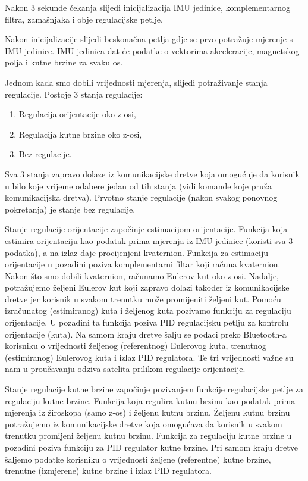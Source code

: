 \documentclass[times, utf8, diplomski, numeric]{templates/template}
\begin{document}
{{{{                Nakon 3 sekunde čekanja slijedi inicijalizacija IMU jedinice, komplementarnog filtra, zamašnjaka i obje regulacijske petlje.

                Nakon inicijalizacije slijedi beskonačna petlja gdje se prvo potražuje mjerenje s IMU jedinice. IMU jedinica dat će podatke o vektorima akceleracije, magnetskog polja i kutne brzine za svaku os. 

                Jednom kada smo dobili vrijednosti mjerenja, slijedi potraživanje stanja regulacije. Postoje 3 stanja regulacije: 

                \begin{enumerate}
                    \item Regulacija orijentacije oko z-osi,
                    \item Regulacija kutne brzine oko z-osi,
                    \item Bez regulacije.
                \end{enumerate}

                Sva 3 stanja zapravo dolaze iz komunikacijske dretve koja omogućuje da korisnik u bilo koje vrijeme odabere jedan od tih stanja (vidi komande koje pruža komunikacijska dretva). Prvotno stanje regulacije (nakon svakog ponovnog pokretanja) je stanje bez regulacije.

                Stanje regulacije orijentacije započinje estimacijom orijentacije. Funkcija koja estimira orijentaciju kao podatak prima mjerenja iz IMU jedinice (koristi sva 3 podatka), a na izlaz daje procijenjeni kvaternion. Funkcija za estimaciju orijentacije u pozadini poziva komplementarni filtar koji računa kvaternion. Nakon što smo dobili kvaternion, računamo Eulerov kut oko z-osi. Nadalje, potražujemo željeni Eulerov kut koji zapravo dolazi također iz komunikacijske dretve jer korisnik u svakom trenutku može promijeniti željeni kut. Pomoću izračunatog (estimiranog) kuta i željenog kuta pozivamo funkciju za regulaciju orijentacije. U pozadini ta funkcija poziva PID regulacijsku petlju za kontrolu orijentacije (kuta). Na samom kraju dretve šalju se podaci preko Bluetooth-a korisniku o vrijednosti željenog (referentnog) Eulerovog kuta, trenutnog (estimiranog) Eulerovog kuta i izlaz PID regulatora. Te tri vrijednosti važne su nam u proučavanju odziva satelita prilikom regulacije orijentacije. 

                Stanje regulacije kutne brzine započinje pozivanjem funkcije regulacijske petlje za regulaciju kutne brzine. Funkcija koja regulira kutnu brzinu kao podatak prima mjerenja iz žiroskopa (samo z-os) i željenu kutnu brzinu. Željenu kutnu brzinu potražujemo iz komunikacijske dretve koja omogućava da korisnik u svakom trenutku promijeni željenu kutnu brzinu. Funkcija za regulaciju kutne brzine u pozadini poziva funkciju za PID regulator kutne brzine. Pri samom kraju dretve šaljemo podatke korisniku o vrijednosti željene (referentne) kutne brzine, trenutne (izmjerene) kutne brzine i izlaz PID regulatora. 

}}}}
\end{document}
